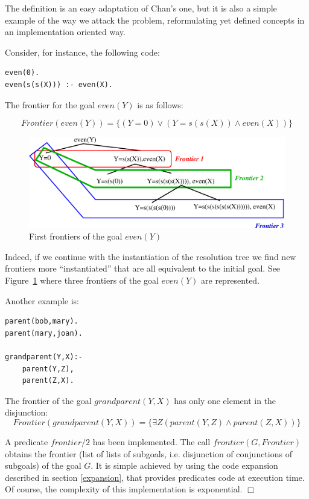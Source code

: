 \documentclass{tlp}
\newcommand{\implementation}[1]{\noindent{\sc Implementation details:}
  #1 $\Box$}
\begin{document}
The definition is an easy adaptation of Chan's one, but it is also a
simple example of the way we attack the problem, reformulating yet
defined concepts in an implementation oriented way.
\medskip

\noindent
Consider, for instance, the following code:
{
\begin{verbatim}
even(0).
even(s(s(X))) :- even(X).
\end{verbatim}
}
The frontier for the goal $even (Y)$ is as follows:

\[Frontier(even(Y)) = \{ ( Y=0 ) \vee ( Y=s(s(X)) \wedge even(X) ) \} \] 

  \begin{figure}
        \centering
        \includegraphics[width=5in]{frontier.eps} 
        \caption{First frontiers of the goal $even(Y)$}
        \label{fig:frontier}
  \end{figure}

Indeed, if we continue with the instantiation of the resolution tree we find
new frontiers more ``instantiated'' that are all equivalent to the initial
goal. See Figure~\ref{fig:frontier} where three frontiers of the goal
$even(Y)$ are represented.

Another example is:
{
\begin{verbatim}
parent(bob,mary).
parent(mary,joan).

grandparent(Y,X):- 
    parent(Y,Z),
    parent(Z,X).
\end{verbatim}
}

The frontier of the goal $grandparent (Y,X)$ has only one element in the
disjunction:
\[Frontier(grandparent(Y,X)) = \{ \exists Z (parent(Y,Z) \wedge parent(Z,X) ) \} \] 

\noindent
\implementation{A predicate $frontier/2$ has been implemented. The
call $frontier(G,Frontier)$ obtains the frontier (list of lists of
subgoals, i.e. disjunction of conjunctions of subgoals) of the goal
$G$. It is simple achieved by using the code expansion described in
section \ref{expansion}, that provides predicates code at execution
time. Of course, the complexity of this implementation is
exponential.}
\end{document}
